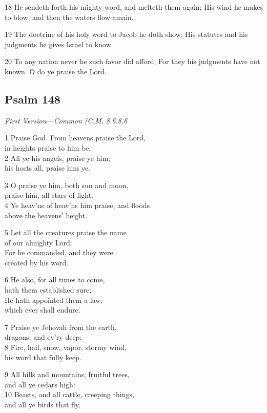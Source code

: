 18 He sendeth forth his mighty word,
and melteth them again;
His wind he makes to blow, and then
the waters flow amain.

19 The doctrine of his holy word
to Jacob he doth show;
His statutes and his judgments he
gives Israel to know.

20 To any nation never he
such favor did afford;
For they his judgments have not known.
O do ye praise the Lord.

\begin{center}
\quad{}\quad{}
\end{center}

\subsection*{Psalm 148}

\emph{First Version---Common (C.M. 8.6.8.6}

1 Praise God. From heavens praise the Lord,\\
in heights praise to him be.\\
2 All ye his angels, praise ye him;\\
his hosts all, praise him ye.

3 O praise ye him, both sun and moon,\\
praise him, all stars of light.\\
4 Ye heav’ns of heav’ns him praise, and floods\\
above the heavens’ height.

5 Let all the creatures praise the name\\
of our almighty Lord:\\
For he commanded, and they were\\
created by his word.

6 He also, for all times to come,\\
hath them established sure;\\
He hath appointed them a law,\\
which ever shall endure.

7 Praise ye Jehovah from the earth,\\
dragons, and ev’ry deep:\\
8 Fire, hail, snow, vapor, stormy wind,\\
his word that fully keep.

9 All hills and mountains, fruitful trees,\\
and all ye cedars high:\\
10 Beasts, and all cattle, creeping things,\\
and all ye birds that fly.


